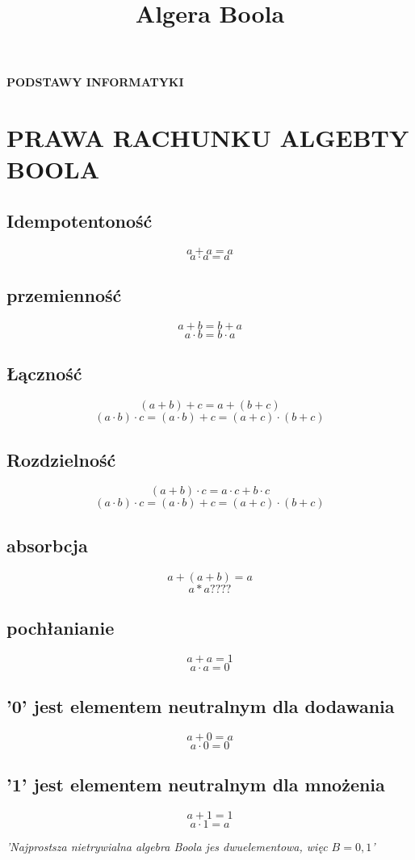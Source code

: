 \documentclass{article}
\title{Algera Boola}
\begin{document}
\begin{titlepage}
	\begin{center}
		\vspace*{1cm}

		\Huge

		\textbf{PODSTAWY INFORMATYKI}

		\vspace{3cm}
	\end{center}
\end{titlepage}
\newpage
\section{PRAWA RACHUNKU ALGEBTY BOOLA}
\subsection{Idempotentoność}
\[a + a = a\]
\[a \cdot a = a\]
\subsection{przemienność}
\[a + b = b + a\]
\[a \cdot b = b \cdot a\]
\subsection{Łączność}
\[(a + b) + c = a + (b + c)\]
\[(a \cdot b) \cdot c = (a \cdot b) + c = (a + c) \cdot (b + c)\]
\subsection{Rozdzielność}
\[(a + b) \cdot c = a \cdot c + b \cdot c\]
\[(a \cdot b) \cdot c = (a \cdot b) + c = (a + c) \cdot (b + c)\]
\subsection{absorbcja}
\[a + (a + b) = a\]
\[a * a ????\]
\subsection{pochłanianie}
\[a + a = 1\]
\[a \cdot a = 0\]
\subsection{'0' jest elementem neutralnym dla dodawania}
\[a + 0 = a\]
\[a \cdot 0 = 0\]
\subsection{'1' jest elementem neutralnym dla mnożenia}
\[a + 1 = 1\]
\[a \cdot 1 = a\]
\begin{center}
	\textit{'Najprostsza nietrywialna algebra Boola jes dwuelementowa, więc $B = {0,1}$'}
\end{center}
\end{document}
